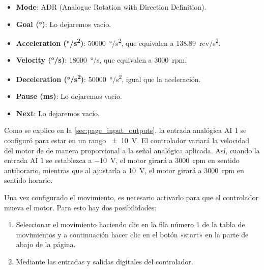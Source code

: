 \documentclass[english,spanish,a4paper,11pt]{article}
\begin{document}
\begin{itemize}
    \item \textbf{Mode}: ADR (Analogue Rotation with Direction Definition).
    \item \textbf{Goal (\unit{\degree})}: Lo dejaremos vacío.
    \item \textbf{Acceleration (\unit{\degree/\s^2})}: \qty{50000}{\degree/\s^2}, que equivalen a \qty{138.89}{rev/\s^2}.
    \item \textbf{Velocity (\unit{\degree/\s})}: \qty{18000}{\degree/\s}, que equivalen a \qty{3000}{rpm}.
    \item \textbf{Deceleration (\unit{\degree/\s^2})}: \qty{50000}{\degree/\s^2}, igual que la aceleración.
    \item \textbf{Pause (\unit{\ms})}: Lo dejaremos vacío.
    \item \textbf{Next}: Lo dejaremos vacío.
\end{itemize}

Como se explico en la \cref{sec:page_input_outputs}, la entrada analógica AI 1 se configuró para estar en un rango \qty{\pm10}{\V}. El controlador variará la velocidad del motor de de manera proporcional a la señal analógica aplicada. Así, cuando la entrada AI 1 se establezca a \qty{-10}{\V}, el motor girará a \qty{3000}{rpm} en sentido antihorario, mientras que al ajustarla a \qty{10}{\V}, el motor girará a \qty{3000}{rpm} en sentido horario.

Una vez configurado el movimiento, es necesario activarlo para que el controlador mueva el motor. Para esto hay dos posibilidades:
\begin{enumerate}
    \item Seleccionar el movimiento haciendo clic en la fila número 1 de la tabla de movimientos y a continuación hacer clic en el botón «start» en la parte de abajo de la página.
    \label{item:drive_profile_brushless_start_1}

    \item Mediante las entradas y salidas digitales del controlador.
    \label{item:drive_profile_brushless_start_2}
\end{enumerate}
\end{document}
